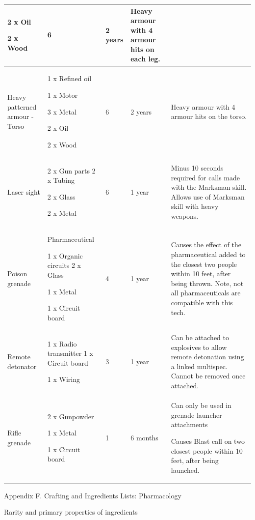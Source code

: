 \begin{table}
\begin{tabular}{|l|l|l|l|l|}
2 x Oil\par 2 x Wood & 6 & 2 years & Heavy armour with 4 armour hits on each leg. \\
 \hline Heavy patterned armour - Torso & 1 x Refined oil\par 1 x Motor\par 3 x Metal\par 2 x Oil\par 2 x Wood & 6 & 2 years & Heavy armour with 4 armour hits on the torso. \\
 \hline Laser sight & 2 x Gun parts 2 x Tubing\par 2 x Glass\par 2 x Metal & 6 & 1 year & Minus 10 seconds required for calls made with the Marksman skill. Allows use of Marksman skill with heavy weapons. \\
 \hline Poison grenade & Pharmaceutical\par 1 x Organic circuits 2 x Glass\par 1 x Metal\par 1 x Circuit board & 4 & 1 year & Causes the effect of the pharmaceutical added to the closest two people within 10 feet, after being thrown. Note, not all pharmaceuticals are compatible with this tech. \\
 \hline Remote detonator & 1 x Radio transmitter 1 x Circuit board\par 1 x Wiring & 3 & 1 year & Can be attached to explosives to allow remote detonation using a linked multispec. Cannot be removed once attached. \\
 \hline Rifle grenade & 2 x Gunpowder\par 1 x Metal\par 1 x Circuit board & 1 & 6 months & Can only be used in grenade launcher attachments\par Causes Blast call on two closest people within 10 feet, after being launched. \\
 \hline \end{tabular}

\end{table}

Appendix F. Crafting and Ingredients Lists: Pharmacology

Rarity and primary properties of ingredients

